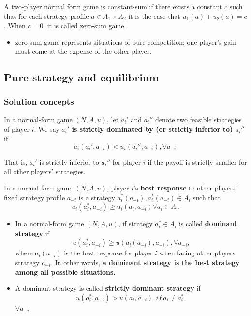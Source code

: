 \begin{refsection}
\begin{definition}
\cite[5]{leyton2008essentials} A two-player normal form game is constant-sum if there exists a constant $c$ such that for each strategy profile $a\in A_1\times A_2$ it is the case that $u_1(a)+u_2(a) = c$. When $c=0$, it is called zero-sum game.
\end{definition}


\begin{remark}\hfill
\begin{itemize}
    \item zero-sum game represents situations of pure competition; one player's gain must come at the expense of the other player.
\end{itemize}
\end{remark}


\subsection{Pure strategy and equilibrium}
\subsubsection{Solution concepts}
\begin{definition}\cite[5]{gibbons1992game} In a normal-form game $(N,A,u)$, let $a_i'$ and $a_i''$ denote two feasible strategies of player $i$. We say \textbf{$a_i'$ is strictly dominated by (or strictly inferior to) $a_i''$} if
	$$u_i(a_i',a_{-i} )< u_i(a_i'',a_{-i}), \forall a_{-i}.$$ 
	
That is, $a_i'$ is strictly inferior to $a_i''$ for player $i$ if the payoff is strictly smaller for all other players' strategies. 	
\end{definition}

\begin{definition}
	\cite[11]{leyton2008essentials} In a normal-form game $(N,A,u)$, player $i$'s \textbf{best response} to other players' fixed strategy profile $a_{-i}$ is a strategy $a_i^*(a_{-i}), a_i^*(a_{-i}) \in A_i$ such that $$u_i(a_i^*,a_{-i}) \geq u_i(a_i,a_{-i}) \forall a_i\in A_i.$$
\end{definition}

\begin{definition}\hfill
\begin{itemize}
	\item In a normal-form game $(N,A,u)$, if strategy $a_i^*\in A_i$ is called \textbf{dominant strategy} if
	$$u(a_i^*,a_{-i}) \geq u(a_i(a_{-i}),a_{-i}), \forall a_{-i},$$
	where $a_i(a_{-i})$ is the best response for player $i$ when facing other players strategy $a_{-i}$.
	In other words, \textbf{a dominant strategy is the best strategy among all possible situations.}
	\item A dominant strategy is called \textbf{strictly dominant strategy} if
	$$u(a_i^*,a_{-i}) > u(a_i,a_{-i}), if ~ a_i\neq a_i^*,$$
	$\forall a_{-i}$.
\end{itemize}	 


\end{definition}
\end{refsection}
